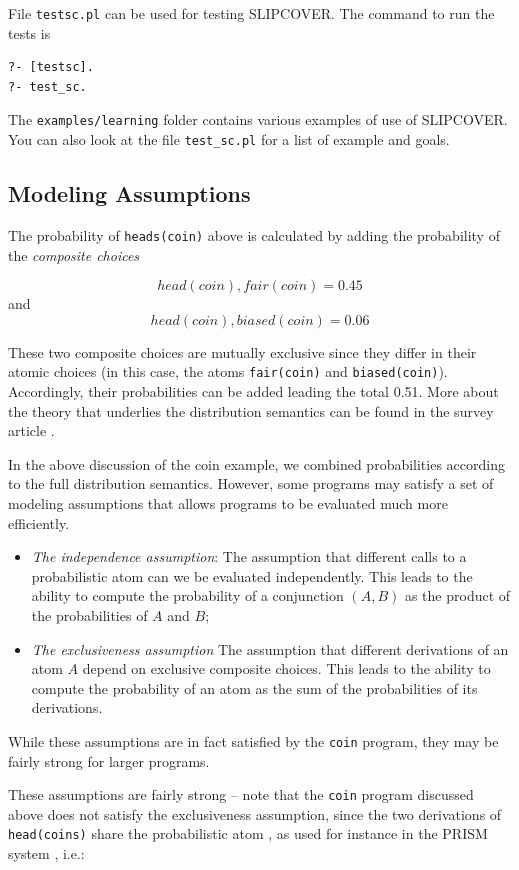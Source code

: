 File \texttt{testsc.pl} can be used for testing SLIPCOVER. The command to run the tests is
\begin{verbatim}
?- [testsc].
?- test_sc.
\end{verbatim} 
The \texttt{examples/learning} folder contains various examples of use of SLIPCOVER. You can 
also look at the file \texttt{test\_sc.pl} for a list of example and goals.



\subsection{Modeling Assumptions}
The probability of  \texttt{heads(coin)} above is calculated by adding the probability of the
{\em composite choices}

\[ head(coin),fair(coin) = 0.45 \]
and 
\[ head(coin),biased(coin) = 0.06\]

These two composite choices are mutually exclusive since they differ
in their atomic choices (in this case, the atoms {\tt fair(coin)} and
{\tt biased(coin)}).  Accordingly, their probabilities can be added
leading the total 0.51.  More about the theory that underlies the
distribution semantics can be found in the survey article
\cite{RigS15}.

In the above discussion of the coin example, we combined probabilities
according to the full distribution semantics.  However, some programs
may satisfy a set of modeling assumptions that allows programs to be
evaluated much more efficiently.
%
\begin{itemize}
\item {\em The independence assumption}: The assumption that different
  calls to a probabilistic atom can we be evaluated independently.
  This leads to the ability to compute the probability of a
  conjunction $(A,B)$ as the product of the probabilities of $A$ and
  $B$;
\item {\em The exclusiveness assumption} The assumption that different
  derivations of an atom $A$ depend on exclusive composite choices.
  This leads to the ability to compute the probability of an atom as
  the sum of the probabilities of its derivations.
\end{itemize}
%
While these assumptions are in fact satisfied by the {\tt coin}
program, they may be fairly strong for larger programs.

These assumptions are fairly strong -- note that the {\tt coin}
program discussed above does not satisfy the exclusiveness assumption,
since the two derivations of {\tt head(coins)} share the probabilistic
atom , as used for instance in the PRISM system
\cite{DBLP:conf/ijcai/SatoK97}, i.e.:

